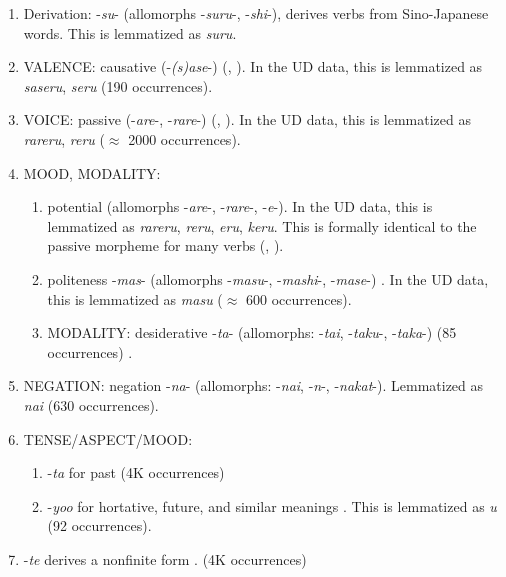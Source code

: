 \documentclass[11pt,letterpaper]{article}
\begin{document}
\begin{enumerate}
\item Derivation: -\textit{su}- (allomorphs -\textit{suru}-, -\textit{shi}-), derives verbs from Sino-Japanese words. This is lemmatized as \textit{suru}.
	\item VALENCE: causative (-\textit{(s)ase}-) (\citet[142]{hasegawa2014japanese}, \citet[Chapter 13]{kaiser2013japanese}). In the UD data, this is lemmatized as \textit{saseru}, \textit{seru} (190 occurrences).
	\item VOICE: passive (-\textit{are}-, -\textit{rare}-) (\citet[152]{hasegawa2014japanese}, \citet[Chapter 12]{kaiser2013japanese}).  In the UD data, this is lemmatized as \textit{rareru}, \textit{reru} ($\approx$ 2000 occurrences).
\item MOOD, MODALITY:
\begin{enumerate}
\item potential (allomorphs -\textit{are}-, -\textit{rare}-, -\textit{e}-). In the UD data, this is lemmatized as \textit{rareru}, \textit{reru}, \textit{eru}, \textit{keru}.
This is formally identical to the passive morpheme for many verbs (\citet[346]{vaccari1938complete}, \citet[398]{kaiser2013japanese}).



\item politeness -\textit{mas}- (allomorphs -\textit{masu}-, -\textit{mashi}-, -\textit{mase}-) \cite[190]{kaiser2013japanese}. %
In the UD data, this is lemmatized as \textit{masu} ($\approx$ 600 occurrences).
\item MODALITY: desiderative -\textit{ta}- (allomorphs: -\textit{tai}, -\textit{taku}-, -\textit{taka}-) (85 occurrences) \cite[238]{kaiser2013japanese}. %
\end{enumerate}
\item NEGATION: negation -\textit{na}- (allomorphs: -\textit{nai}, -\textit{n}-, -\textit{nakat}-). 
Lemmatized as \textit{nai} (630 occurrences).
\item TENSE/ASPECT/MOOD:
\begin{enumerate}
\item -\textit{ta} for past (4K occurrences) \cite[211]{kaiser2013japanese}
\item -\textit{yoo} for hortative, future, and similar meanings \cite[229]{kaiser2013japanese}. This is lemmatized as \textit{u} (92 occurrences).
\end{enumerate}
\item -\textit{te} derives a nonfinite form \cite[186]{kaiser2013japanese}. (4K occurrences)
\end{enumerate}
\end{document}
